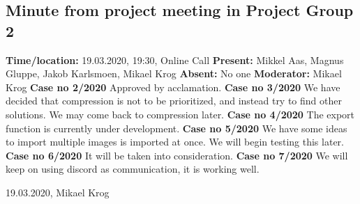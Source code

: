 \documentclass{article}
\begin{document}
\newpage
\subsection{Minute from project meeting in Project Group 2}
\newline
\textbf{Time/location:} 19.03.2020, 19:30, Online Call
\newline
\textbf{Present: }Mikkel Aas, Magnus Gluppe, Jakob Karlsmoen, Mikael Krog
\newline
\textbf{Absent:} No one
\newline
\textbf{Moderator:} Mikael Krog
\newline \newline
\textbf{Case no 2/2020} \newline
Approved by acclamation.
\newline  \newline
\textbf{Case no 3/2020}  \newline
We have decided that compression is not to be prioritized, and instead try to find other solutions. We may come back to compression later.
\newline  \newline
\textbf{Case no 4/2020}  \newline
The export function is currently under development.
\newline  \newline
\textbf{Case no 5/2020}  \newline
We have some ideas to import multiple images is imported at once. We will begin testing this later.
\newline  \newline
\textbf{Case no 6/2020}  \newline
It will be taken into consideration.
\newline  \newline
\textbf{Case no 7/2020}  \newline
We will keep on using discord as communication, it is working well.
\begin{flushright}19.03.2020, Mikael Krog\end{flushright}


\newpage
\end{document}
